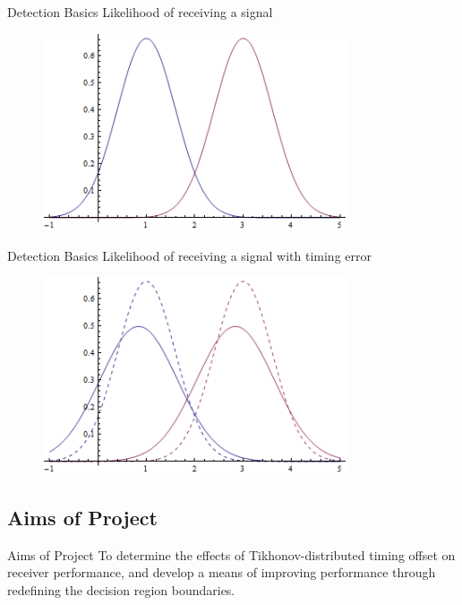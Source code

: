 \documentclass[xcolor=x11names,compress]{beamer}
\renewcommand{\(}{\begin{columns}}
\renewcommand{\)}{\end{columns}}
\newcommand{\<}[1]{\begin{column}{#1}}
\renewcommand{\>}{\end{column}}
\begin{document}
\begin{frame}{Detection Basics}
Likelihood of receiving a signal
\begin{figure}[h!]
  \centering
    \includegraphics[width=0.8\textwidth]{../../plots/seminar_gaussian_sync.png}
\end{figure}
\end{frame}

\begin{frame}{Detection Basics}
Likelihood of receiving a signal with timing error
\begin{figure}[h!]
  \centering
    \includegraphics[width=0.8\textwidth]{../../plots/seminar_gaussian_error.png}
\end{figure}
\end{frame}

\subsection{Aims of Project}
\begin{frame}{Aims of Project}
To determine the effects of Tikhonov-distributed timing offset on receiver performance, and develop a means of improving performance through redefining the decision region boundaries.
\end{frame}
\end{document}
